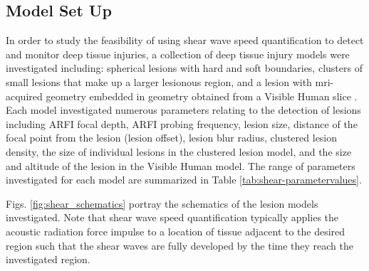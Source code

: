		\subsection{Model Set Up}
		\label{subsec:model_setup}
			In order to study the feasibility of using shear wave speed quantification to detect and monitor deep tissue injuries, a collection of deep tissue injury models were investigated including: spherical lesions with hard and soft boundaries, clusters of small lesions that make up a larger lesionous region, and a lesion with mri-acquired geometry \cite{solis13} embedded in geometry obtained from a Visible Human slice \cite{visiblehuman}. Each model investigated numerous parameters relating to the detection of lesions including ARFI focal depth, ARFI probing frequency, lesion size, distance of the focal point from the lesion (lesion offset), lesion blur radius, clustered lesion density, the size of individual lesions in the clustered lesion model, and the size and altitude of the lesion in the Visible Human model. The range of parameters investigated for each model are summarized in Table \ref{tab:shear-parametervalues}.

			Figs. \ref{fig:shear_schematics} portray the schematics of the lesion models investigated. Note that shear wave speed quantification typically applies the acoustic radiation force impulse to a location of tissue adjacent to the desired region such that the shear waves are fully developed by the time they reach the investigated region.

